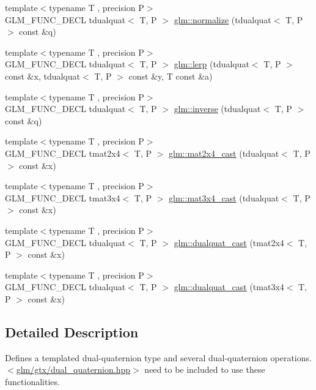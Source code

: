 \begin{DoxyCompactItemize}
\item 
{\footnotesize template$<$typename T , precision P$>$ }\\G\-L\-M\-\_\-\-F\-U\-N\-C\-\_\-\-D\-E\-C\-L tdualquat$<$ T, P $>$ \hyperlink{group__gtx__dual__quaternion_ga495818aa48c23e9e730f87a3c337d1d5}{glm\-::normalize} (tdualquat$<$ T, P $>$ const \&q)
\item 
{\footnotesize template$<$typename T , precision P$>$ }\\G\-L\-M\-\_\-\-F\-U\-N\-C\-\_\-\-D\-E\-C\-L tdualquat$<$ T, P $>$ \hyperlink{group__gtx__dual__quaternion_ga8039b88397ca09275be924a26a806a59}{glm\-::lerp} (tdualquat$<$ T, P $>$ const \&x, tdualquat$<$ T, P $>$ const \&y, T const \&a)
\item 
{\footnotesize template$<$typename T , precision P$>$ }\\G\-L\-M\-\_\-\-F\-U\-N\-C\-\_\-\-D\-E\-C\-L tdualquat$<$ T, P $>$ \hyperlink{group__gtx__dual__quaternion_ga2149d3cb8af04d9530de0cd16aa1aab2}{glm\-::inverse} (tdualquat$<$ T, P $>$ const \&q)
\item 
{\footnotesize template$<$typename T , precision P$>$ }\\G\-L\-M\-\_\-\-F\-U\-N\-C\-\_\-\-D\-E\-C\-L tmat2x4$<$ T, P $>$ \hyperlink{group__gtx__dual__quaternion_ga2d124748183e12db8288eeaca350298e}{glm\-::mat2x4\-\_\-cast} (tdualquat$<$ T, P $>$ const \&x)
\item 
{\footnotesize template$<$typename T , precision P$>$ }\\G\-L\-M\-\_\-\-F\-U\-N\-C\-\_\-\-D\-E\-C\-L tmat3x4$<$ T, P $>$ \hyperlink{group__gtx__dual__quaternion_ga576745d979e3c079a64152490c816954}{glm\-::mat3x4\-\_\-cast} (tdualquat$<$ T, P $>$ const \&x)
\item 
{\footnotesize template$<$typename T , precision P$>$ }\\G\-L\-M\-\_\-\-F\-U\-N\-C\-\_\-\-D\-E\-C\-L tdualquat$<$ T, P $>$ \hyperlink{group__gtx__dual__quaternion_gada9799afe2b62394dc498534beb5bc78}{glm\-::dualquat\-\_\-cast} (tmat2x4$<$ T, P $>$ const \&x)
\item 
{\footnotesize template$<$typename T , precision P$>$ }\\G\-L\-M\-\_\-\-F\-U\-N\-C\-\_\-\-D\-E\-C\-L tdualquat$<$ T, P $>$ \hyperlink{group__gtx__dual__quaternion_ga20eb5758beb73cc6dbc2d9104f03ec20}{glm\-::dualquat\-\_\-cast} (tmat3x4$<$ T, P $>$ const \&x)
\end{DoxyCompactItemize}


\subsection{Detailed Description}
Defines a templated dual-\/quaternion type and several dual-\/quaternion operations. $<$\hyperlink{dual__quaternion_8hpp}{glm/gtx/dual\-\_\-quaternion.\-hpp}$>$ need to be included to use these functionalities. 

